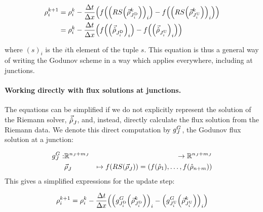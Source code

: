 						\begin{align}
							\discrete{\link}{\tind+1} & =\discrete{\link}{\tind}-\dfrac{\Delta t}{\Delta x}\left(f\left(\left(\RS\left(\juncstate{\jdown{\link}}{\tind}\right)\right)_{\link}\right)-f\left(\left(\RS\left(\juncstate{\jup{\link}}{\tind}\right)\right)_{\link}\right)\right)\nonumber \\
							                          & =\discrete{\link}{\tind}-\dfrac{\Delta t}{\Delta x}\left(f\left(\left(\junctrace{\jdown{\link}}{}\right)_{\link}\right)-f\left(\left(\junctrace{\jup{\link}}{}\right)_{\link}\right)\right)\label{eq:reg-update}                               
						\end{align}
												
												
						where $\left(s\right)_{i}$ is the $i$th element of the tuple $s$.
						This equation is thus a general way of writing the Godunov scheme
						in a way which applies everywhere, including at junctions.
												
												
						\paragraph{Working directly with flux solutions at junctions.\label{par:Composing-the-Riemann}}
												
						The equations can be simplified if we do not explicitly represent
						the solution of the Riemann solver, $\vec{\hat{\rho}}_{J}^{}$, and, instead,
						directly calculate the flux solution from the Riemann data. We denote
						this direct computation by $g^{G}_{J}$, the Godunov flux solution
						at a junction:
												
						\begin{eqnarray}
							\god_{\jn}: & \mathbb{R}^{\ninc_{\jn}+\nout_{\jn}} & \rightarrow\mathbb{R}^{\ninc_{\jn}+\nout_{\jn}}\nonumber \\
							& \juncstate{\jn}{} & \mapsto f\left(RS\left(\juncstate{\jn}{}\right)\right)=\left(f\left(\trace{\dvar}_{1}\right),\ldots,f\left(\trace{\dvar}_{\ninc+\nout}\right)\right)\label{eq:god-jn}
						\end{eqnarray}
						This gives a simplified expressions for the update step:
												
						\begin{equation}
							\discrete{\link}{\tind+1}=\discrete{\link}{\tind}-\dfrac{\Delta t}{\Delta x}\left(\left(\god_{\jdown{\link}}\left(\juncstate{\jdown{\link}}{\tind}\right)\right)_{\link}-\left(\god_{\jup{\link}}\left(\juncstate{\jup{\link}}{\tind}\right)\right)_{\link}\right)\label{eq:composed-flux}
						\end{equation}
												
